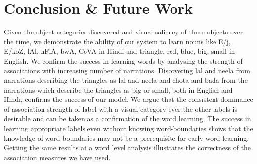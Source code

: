 \documentclass[12pt, a4paper]{report}
\begin{document}
\chapter{Conclusion \& Future Work}
Given the object categories discovered and visual saliency of these objects over the time, we demonstrate the ability of our system to learn nouns like {\dn E/j}, {\dn E/koZ}, {\dn lAl}, {\dn nFlA}, {\dn bwA}, {\dn CoVA} in Hindi and  triangle, red, blue, big, small in English. We confirm the success in learning words by analysing the strength of associations with increasing number of narrations. Discovering lal and neela from narrations describing the triangles as lal and neela and chota and bada from the narrations which describe the triangles as big or small, both in English and Hindi, confirms the success of our model. We argue that the consistent dominance of association strength of label with a visual category over the other labels is desirable and can be taken as a confirmation of the word learning. The success in learning appropriate labels even without knowing word-boundaries shows that the knowledge of word boundaries may not be a prerequisite for early word-learning. Getting the same results at a word level analysis illustrates the correctness of the association measures we have used.

\end{document}
